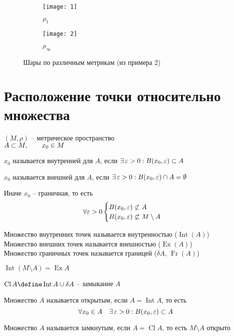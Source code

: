 \begin{figure}[!ht]
	\begin{subfigure}{0.49\textwidth}
		\texttt{[image: 1]}
		\caption{$\rho_1$}
	\end{subfigure}
	\begin{subfigure}{0.49\textwidth}
		\texttt{[image: 2]}
		\caption{$\rho_\infty$}
	\end{subfigure}
	\caption{Шары по различным метрикам (из примера 2)}
\end{figure}

\section{Расположение точки относительно множества}

$ (M, \rho)$ -- метрическое пространство \\
$ A \subset M, \qquad x_0 \in M $

\begin{definition}
	$x_0$ называется внутренней для $A$, если $\exists\, \varepsilon > 0 : B(x_0, \varepsilon) \subset A $
\end{definition}

\begin{definition}
	$x_0$ называется внешней для $A$, если $\exists\, \varepsilon > 0 : B(x_0, \varepsilon) \cap A = \emptyset $
\end{definition}

\begin{definition}
	Иначе $x_0$ -- граничная, то есть
	$$ \forall \varepsilon > 0
	\begin{cases}
		B(x_0, \varepsilon) \not\subset A \\
		B(x_0, \varepsilon) \not\subset M \setminus A
	\end{cases} $$
\end{definition}

\begin{definition}
	Множество внутренних точек называется внутренностью ($\operatorname{Int}(A)$) \\
	Множество внешних точек называется внешностью ($\operatorname{Ex}(A)$) \\
	Множество граничных точек называется границей ($\delta A$, $\operatorname{Fr}(A)$)
\end{definition}

\begin{intuition}
	$ \operatorname{Int} (M \setminus A) = \operatorname{Ex} A $
\end{intuition}

\begin{definition}
	$ \operatorname{Cl} A \define \operatorname{Int} A \cup \delta A $ -- замыкание $A$
\end{definition}

\begin{definition}
	Множество $A$ называется открытым, если $A = \operatorname{Int} A $, то есть
	$$ \forall x_0 \in A \quad \exists\, \varepsilon > 0 : B(x_0, \varepsilon) \subset A $$
\end{definition}

\begin{definition}
	Множество $A$ называется замкнутым, если $A = \operatorname{Cl} A $, то есть $M \setminus A$ открыто
\end{definition}
